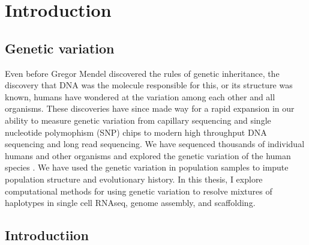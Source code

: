 
\chapter{Introduction}

\ifpdf
    \graphicspath{{Chapter1/Figs/Raster/}{Chapter1/Figs/PDF/}{Chapter1/Figs/}}
\else
    \graphicspath{{Chapter1/Figs/Vector/}{Chapter1/Figs/}}
\fi

\section{Genetic variation}

\par{
Even before Gregor Mendel discovered the rules of genetic inheritance\cite{mendel}, the discovery that DNA was the molecule responsible for this\cite{Avery}, or its structure was known\cite{watsoncrick}, humans have wondered at the variation among each other and all organisms. These discoveries have since made way for a rapid expansion in our ability to measure genetic variation from capillary sequencing\cite{capillary} and single nucleotide polymophism (SNP) chips\cite{snpchip} to modern high throughput DNA sequencing\cite{bridgeamp} and long read sequencing\cite{HIFI}. We have sequenced thousands of individual humans and other organisms and explored the genetic variation of the human species \cite{1kgenomes}\cite{1kgenomes2}\cite{haplotypepanel}\cite{ukbiobank}\cite{hapmap}. We have used the genetic variation in population samples to impute population structure and evolutionary history\cite{NGSadmix}\cite{angsd}\cite{estimateadmixture}\cite{abbababa}\cite{shapeit4}\cite{beagle}. In this thesis, I explore computational methods for using genetic variation to resolve mixtures of haplotypes in single cell RNAseq, genome assembly, and scaffolding.
} 

\section{Introductiion}

